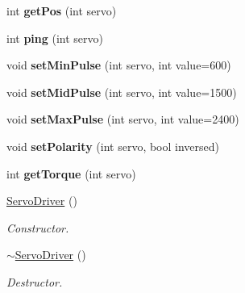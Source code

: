 \begin{DoxyCompactItemize}
\mbox{\label{classServoDriver_a53c3d2e48084d579a2a570b97220c835}} 
int {\bfseries get\+Pos} (int servo)
\item 
\mbox{\label{classServoDriver_a952fbbfdbf9d0b57d5c6d6c09019b366}} 
int {\bfseries ping} (int servo)
\item 
\mbox{\label{classServoDriver_a40ec259cb0ced3154b1e73cc52d48938}} 
void {\bfseries set\+Min\+Pulse} (int servo, int value=600)
\item 
\mbox{\label{classServoDriver_a92d53f7f50a7eb95e14ae358ad0b7d23}} 
void {\bfseries set\+Mid\+Pulse} (int servo, int value=1500)
\item 
\mbox{\label{classServoDriver_aaaeaab97cef5c2ebcd05c265fdff747f}} 
void {\bfseries set\+Max\+Pulse} (int servo, int value=2400)
\item 
\mbox{\label{classServoDriver_a89b2add38109f20260369e0a0d747bf2}} 
void {\bfseries set\+Polarity} (int servo, bool inversed)
\item 
\mbox{\label{classServoDriver_a108cce4f0dcf60bf443ee932621bc89c}} 
int {\bfseries get\+Torque} (int servo)
\item 
\mbox{\label{classServoDriver_a2076bae148e26ee3f854f1f1984d9714}} 
\hyperlink{classServoDriver_a2076bae148e26ee3f854f1f1984d9714}{Servo\+Driver} ()
\begin{DoxyCompactList}\small\item\em Constructor. \end{DoxyCompactList}\item 
\mbox{\label{classServoDriver_acf6cad7d5b891fbe4ff44eaec8409db7}} 
\hyperlink{classServoDriver_acf6cad7d5b891fbe4ff44eaec8409db7}{$\sim$\+Servo\+Driver} ()
\begin{DoxyCompactList}\small\item\em Destructor. \end{DoxyCompactList}\item 
\mbox{\label{classServoDriver_af580283b3d1765c9a27276e9a870cf88}} 

\end{DoxyCompactItemize}
